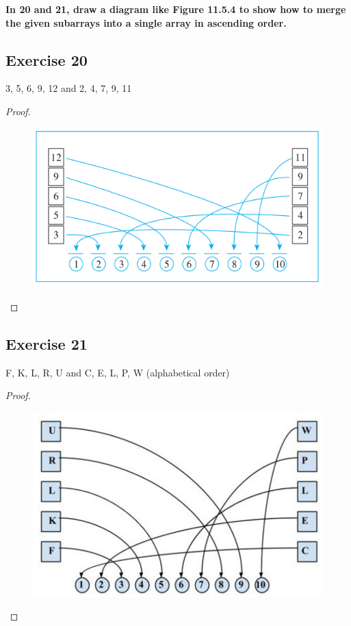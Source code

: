 \documentclass[14pt]{extarticle}
\newcommand{\cy}{\color{cyan}}
\begin{document}
{\bf \cy In 20 and 21, draw a diagram like Figure 11.5.4 to show how to merge the given subarrays into a single array in 
ascending order.}

\subsection{Exercise 20}
3, 5, 6, 9, 12 and 2, 4, 7, 9, 11

\begin{proof}
\begin{figure}[ht!]
\centering
\includegraphics[scale=0.5]{../images/11.5.20.png}
\end{figure}
\end{proof}

\subsection{Exercise 21}
F, K, L, R, U and C, E, L, P, W (alphabetical order)

\begin{proof}
\begin{figure}[ht!]
\centering
\includegraphics[scale=0.3]{../images/11.5.21.png}
\end{figure}
\end{proof}
\end{document}
